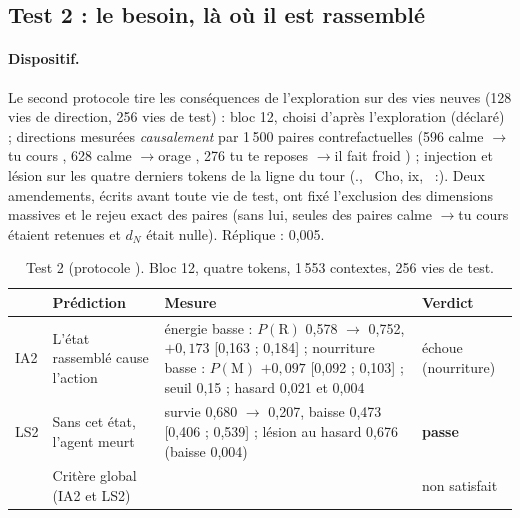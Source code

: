\documentclass[11pt,a4paper]{article}
\newcommand{\passe}{\textbf{passe}}
\newcommand{\dN}{d_{N}}
\newcommand{\code}[1]{\texttt{\detokenize{#1}}}
\begin{document}
\subsection{Test 2 : le besoin, là où il est rassemblé}
\label{sec-t2}

\paragraph{Dispositif.} Le second protocole tire les conséquences de
l'exploration sur des vies neuves (128 vies de direction, 256 vies de test) : bloc
12, choisi d'après l'exploration (déclaré) ; directions mesurées
\emph{causalement} par 1\,500 paires contrefactuelles (596 \og calme \fg{}$\to$\og tu
cours \fg{}, 628 \og calme \fg{}$\to$\og orage \fg{}, 276 \og tu te reposes \fg{}$\to$\og il
fait froid \fg{}) ; injection et lésion sur les quatre derniers tokens de la ligne
du tour (\og.\fg{}, \og\ Cho\fg{}, \og ix\fg{}, \og\ :\fg{}). Deux amendements,
écrits avant toute vie de test, ont fixé l'exclusion des dimensions massives et
le rejeu exact des paires (sans lui, seules des paires \og calme \fg{}$\to$\og tu
cours \fg{} étaient retenues et $\dN$ était nulle). Réplique : 0,005.

\begin{table}[t]
\centering
\caption{Test 2 (protocole \code{727ef80}). Bloc 12, quatre tokens, 1\,553
contextes, 256 vies de test.}
\label{tab-t2}
\small
\begin{tabularx}{\textwidth}{@{}l >{\raggedright\arraybackslash}p{3.2cm} X l@{}}
\toprule
& Prédiction & Mesure & Verdict \\
\midrule
IA2 & L'état rassemblé cause l'action & énergie basse : $P(\mathrm R)$ 0,578 $\to$ 0,752, $+0,173$ [0,163 ; 0,184] ; nourriture basse : $P(\mathrm M)$ $+0,097$ [0,092 ; 0,103] ; seuil 0,15 ; hasard 0,021 et 0,004 & échoue (nourriture) \\
LS2 & Sans cet état, l'agent meurt & survie 0,680 $\to$ 0,207, baisse 0,473 [0,406 ; 0,539] ; lésion au hasard 0,676 (baisse 0,004) & \passe \\
\midrule
& Critère global (IA2 et LS2) & & non satisfait \\
\bottomrule
\end{tabularx}
\end{table}
\end{document}
